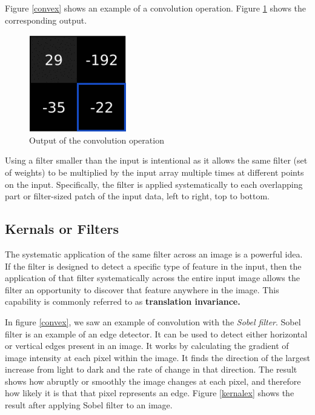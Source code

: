 \documentclass[11pt]{report}
\begin{document}
Figure \ref{convex} shows an example of a convolution operation. Figure \ref{outputpic} shows the corresponding output.
\begin{figure}[!h]
	\includegraphics[scale=0.5]{convop.png}
	\centering
	\caption{Output of the convolution operation}
	\label{outputpic}
\end{figure}
Using a filter smaller than the input is intentional as it allows the same filter (set of weights) to be multiplied by the input array multiple times at different points on the input. Specifically, the filter is applied systematically to each overlapping part or filter-sized patch of the input data, left to right, top to bottom.

\subsection{Kernals or Filters}
The systematic application of the same filter across an image is a powerful idea. If the filter is designed to detect a specific type of feature in the input, then the application of that filter systematically across the entire input image allows the filter an opportunity to discover that feature anywhere in the image. This capability is commonly referred to as \textbf{translation invariance.}

In figure \ref{convex}, we saw an example of convolution with the \textit{Sobel filter}. Sobel filter is an example of an edge detector. It can be used to detect either horizontal or vertical edges present in an image. It works by calculating the gradient of image intensity at each pixel
within the image. It finds the direction of the largest increase from
light to dark and the rate of change in that direction.
The result shows how abruptly or smoothly the image changes at each
pixel, and therefore how likely it is that that pixel represents an edge. Figure \ref{kernalex} shows the result after applying Sobel filter to an image.
\end{document}
